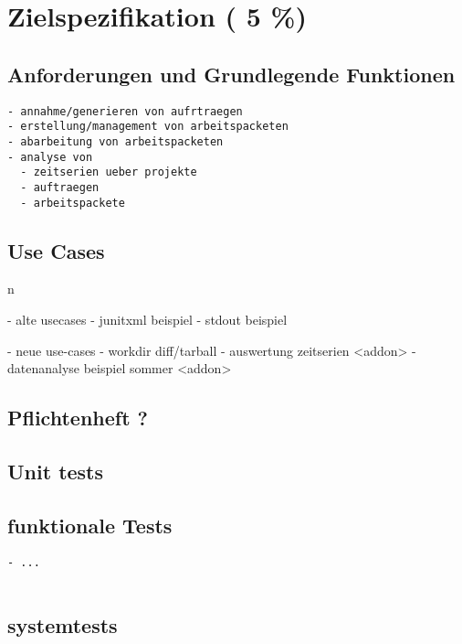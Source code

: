 \chapter{Zielspezifikation ( 5 \%)}





\section{Anforderungen und Grundlegende Funktionen}

\begin{verbatim}
- annahme/generieren von aufrtraegen
- erstellung/management von arbeitspacketen
- abarbeitung von arbeitspacketen
- analyse von
  - zeitserien ueber projekte
  - auftraegen
  - arbeitspackete
\end{verbatim}

\section{Use Cases}n

- alte usecases
  - junitxml beispiel
  - stdout beispiel

- neue use-cases
  - workdir diff/tarball
  - auswertung zeitserien <addon>
  - datenanalyse beispiel sommer <addon>

\section{Pflichtenheft ?}
\section{Unit tests}
\section{funktionale Tests}

\begin{verbatim}
- ...


\end{verbatim}

\section{systemtests}


